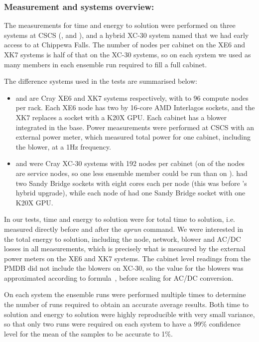 \subsubsection{Measurement and systems overview:}
The measurements for time and energy to solution were performed on three systems at CSCS (\rosa, \daint and \todi), and a hybrid XC-30 system named \clogin that we had early access to at Chippewa Falls.
The number of nodes per cabinet on the XE6 and XK7 systems is half of that on the XC-30 systems, so on each system we used as many members in each ensemble run required to fill a full cabinet.

The difference systems used in the tests are summarised below:
\begin{itemize}
\item
    \textbf{\rosa} and \textbf{\todi} are Cray XE6 and XK7 systems respectively, with to 96 compute nodes per rack. Each XE6 node has two by 16-core AMD Interlagos sockets, and the XK7 replaces a socket with a K20X GPU. Each cabinet has a blower integrated in the base. Power measurements were performed at CSCS with an external power meter, which measured total power for one cabinet, including the blower, at a 1Hz frequency.
\item
    \textbf{\daint} and \textbf{\clogin} were Cray XC-30 systems with 192 nodes per cabinet (on  of the nodes are service nodes, so one less ensemble member could be run than on \clogin). \daint had two Sandy Bridge sockets with eight cores each per node (this was before \daint's hybrid upgrade), while each node of \clogin had one Sandy Bridge socket with one K20X GPU.
\end{itemize}

In our tests, time and energy to solution were for total time to solution, i.e. measured directly before and after the \textit{aprun} command.
We were interested in the total energy to solution, including the node, network, blower and AC/DC losses in all measurements, which is precisely what is measured by the external power meters on the XE6 and XK7 systems.
The cabinet level readings from the PMDB did not include the blowers on XC-30, so the value for the blowers was approximated according to formula~, before scaling for AC/DC conversion.

On each system the ensemble runs were performed multiple times to determine the number of runs required to obtain an accurate average results. Both time to solution and energy to solution were highly reproducible with very small variance, so that only two runs were required on each system to have a 99\% confidence level for the mean of the samples to be accurate to 1\%.

